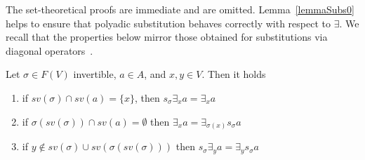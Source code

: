 \documentclass{llncs}
\newcommand{\comment}[1]{}
\begin{document}
The set-theoretical proofs are immediate and are omitted. Lemma~\ref{lemmaSubs0} helps to ensure that polyadic substitution behaves correctly with respect to $\exists$. 
We recall that the properties below mirror 
those obtained for substitutions via diagonal operators~\cite{jlamp17}.

\comment{
\begin{remark}
With respect to the notion of diagonal
operators~\cite{xxx}\todo{Manca citazione}, as e.g. adopted in~\cite{jlamp17}, in the present context they are not defined, since in our RePOs we do not have the $\top$ elements.

DIRE DI PIU'
\end{remark}
}

\begin{lemma}
	\label{lemmaSubs0}
	Let $\sigma \in F(V)$ invertible, $a \in A$, and $x, y \in V$. Then it holds
	\begin{enumerate}
		\item if $sv(\sigma) \cap sv(a) = \{x\}$, then $s_{\sigma} \exists_x a = \exists_x a$
		\item if $\sigma(sv(\sigma)) \cap sv(a) = \emptyset$ then 
		$\exists_x a = \exists_{\sigma(x)} s_{\sigma} a$
		\item if $y \not \in sv(\sigma) \cup sv(\sigma(sv(\sigma)))$ then 
		$s_{\sigma} \exists_y a = \exists_y s_{\sigma} a$
	\end{enumerate}
\end{lemma}
\end{document}
